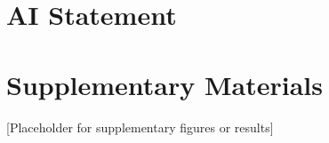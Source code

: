 \documentclass[conference]{IEEEtran}
\begin{document}
\section*{AI Statement}




\section*{Supplementary Materials}
[Placeholder for supplementary figures or results]

\clearpage
\onecolumn
\end{document}

